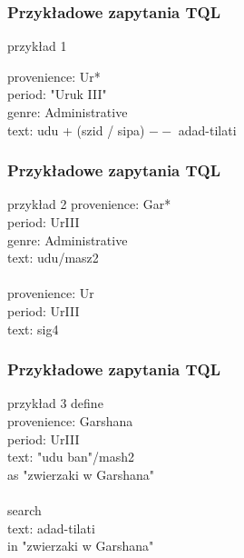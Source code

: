 \begin{frame}


     \frametitle{Przykładowe zapytania TQL}

\begin{block}{przykład 1}

provenience: Ur*\\
period: "Uruk III"\\
genre: Administrative\\
text: udu + (szid / sipa) $--$ adad-tilati\\

\end{block}
\end{frame}



\begin{frame}
\frametitle{Przykładowe zapytania TQL}
\begin{block}{przykład 2}
provenience: Gar*\\
period: UrIII\\
genre: Administrative\\
text: udu/masz2\\
~\\
provenience: Ur\\
period: UrIII\\
text: sig4\\
\end{block}
\end{frame}

\begin{frame}
 \frametitle{Przykładowe zapytania TQL}
\begin{block}{przykład 3}
define\\
  provenience: Garshana\\
  period: UrIII\\
  text: "udu ban"/mash2\\
as "zwierzaki w Garshana"\\
~\\
search\\
  text: adad-tilati\\
in "zwierzaki w Garshana"\\
\end{block}
\end{frame}
